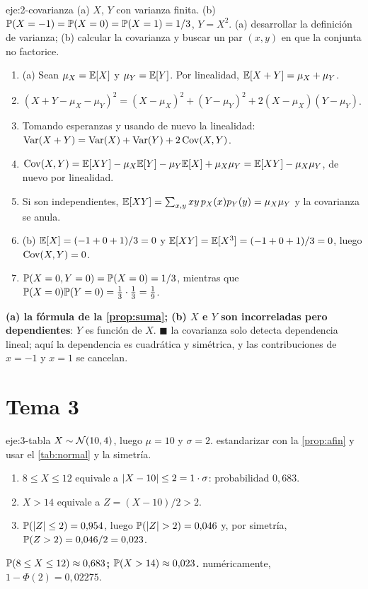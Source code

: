\begin{solucion}{eje:2-covarianza}
\datos (a) $X$, $Y$ con varianza finita. (b) $\mathbb{P}(X=-1)=\mathbb{P}(X=0)=\mathbb{P}(X=1)=1/3$, $Y=X^{2}$.
\planteamiento (a) desarrollar la definición de varianza; (b) calcular la covarianza y buscar un par $(x,y)$ en que la conjunta no factorice.
\pasos
\begin{enumerate}[label=\arabic*.]
  \item (a) Sean $\mu_X=\mathbb{E}[X]$ y $\mu_Y=\mathbb{E}[Y]$. Por linealidad, $\mathbb{E}[X+Y]=\mu_X+\mu_Y$.
  \item $(X+Y-\mu_X-\mu_Y)^{2}=(X-\mu_X)^{2}+(Y-\mu_Y)^{2}+2(X-\mu_X)(Y-\mu_Y)$.
  \item Tomando esperanzas y usando de nuevo la linealidad: $\operatorname{Var}(X+Y)=\operatorname{Var}(X)+\operatorname{Var}(Y)+2\operatorname{Cov}(X,Y)$.
  \item $\operatorname{Cov}(X,Y)=\mathbb{E}[XY]-\mu_X\mathbb{E}[Y]-\mu_Y\mathbb{E}[X]+\mu_X\mu_Y=\mathbb{E}[XY]-\mu_X\mu_Y$, de nuevo por linealidad.
  \item Si son independientes, $\mathbb{E}[XY]=\sum_{x,y}xy\,p_X(x)p_Y(y)=\mu_X\mu_Y$ y la covarianza se anula.
  \item (b) $\mathbb{E}[X]=(-1+0+1)/3=0$ y $\mathbb{E}[XY]=\mathbb{E}[X^{3}]=(-1+0+1)/3=0$, luego $\operatorname{Cov}(X,Y)=0$.
  \item $\mathbb{P}(X=0,Y=0)=\mathbb{P}(X=0)=1/3$, mientras que $\mathbb{P}(X=0)\mathbb{P}(Y=0)=\frac13\cdot\frac13=\frac19$.
\end{enumerate}
\resultado \textbf{(a) la fórmula de la \cref{prop:suma}; (b) $X$ e $Y$ son incorreladas pero dependientes}: $Y$ es función de $X$. $\blacksquare$
\comprobacion la covarianza solo detecta dependencia lineal; aquí la dependencia es cuadrática y simétrica, y las contribuciones de $x=-1$ y $x=1$ se cancelan.
\end{solucion}

\section{Tema 3}

\begin{solucion}{eje:3-tabla}
\datos $X\sim\mathcal{N}(10,4)$, luego $\mu=10$ y $\sigma=2$.
\planteamiento estandarizar con la \cref{prop:afin} y usar el \cref{tab:normal} y la simetría.
\pasos
\begin{enumerate}[label=\arabic*.]
  \item $8\le X\le 12$ equivale a $\lvert X-10\rvert\le 2=1\cdot\sigma$: probabilidad $0{,}683$.
  \item $X>14$ equivale a $Z=(X-10)/2>2$.
  \item $\mathbb{P}(\lvert Z\rvert\le 2)=0{,}954$, luego $\mathbb{P}(\lvert Z\rvert>2)=0{,}046$ y, por simetría, $\mathbb{P}(Z>2)=0{,}046/2=0{,}023$.
\end{enumerate}
\resultado \textbf{$\mathbb{P}(8\le X\le 12)\approx 0{,}683$; $\mathbb{P}(X>14)\approx 0{,}023$.}
\comprobacion numéricamente, $1-\Phi(2)=0{,}02275$.
\end{solucion}

